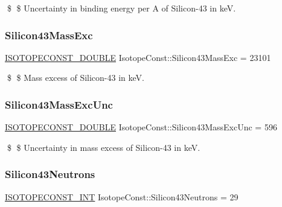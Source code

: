 \$ \$ Uncertainty in binding energy per A of Silicon-\/43 in keV. \mbox{\label{group___isotope_const-_silicon-_si43_ga5a1d3ba1c474ea1b5d1d195046d10e4e}} 
\subsubsection{\texorpdfstring{Silicon43\+Mass\+Exc}{Silicon43MassExc}}
{\footnotesize\ttfamily \mbox{\hyperlink{group___isotope_const-_macros_ga8f45a7272ce02c0b4c65c44636ed719a}{I\+S\+O\+T\+O\+P\+E\+C\+O\+N\+S\+T\+\_\+\+D\+O\+U\+B\+LE}} Isotope\+Const\+::\+Silicon43\+Mass\+Exc = 23101}

\$ \$ Mass excess of Silicon-\/43 in keV. \mbox{\label{group___isotope_const-_silicon-_si43_gaa9d9c7b612687e5ddb2f2b5958523ca4}} 
\subsubsection{\texorpdfstring{Silicon43\+Mass\+Exc\+Unc}{Silicon43MassExcUnc}}
{\footnotesize\ttfamily \mbox{\hyperlink{group___isotope_const-_macros_ga8f45a7272ce02c0b4c65c44636ed719a}{I\+S\+O\+T\+O\+P\+E\+C\+O\+N\+S\+T\+\_\+\+D\+O\+U\+B\+LE}} Isotope\+Const\+::\+Silicon43\+Mass\+Exc\+Unc = 596}

\$ \$ Uncertainty in mass excess of Silicon-\/43 in keV. \mbox{\label{group___isotope_const-_silicon-_si43_gaf3d9e0227aabbda7d12e21a9d557c71b}} 
\subsubsection{\texorpdfstring{Silicon43\+Neutrons}{Silicon43Neutrons}}
{\footnotesize\ttfamily \mbox{\hyperlink{group___isotope_const-_macros_ga5f18360b3e99483a35c32d789e62621c}{I\+S\+O\+T\+O\+P\+E\+C\+O\+N\+S\+T\+\_\+\+I\+NT}} Isotope\+Const\+::\+Silicon43\+Neutrons = 29}

